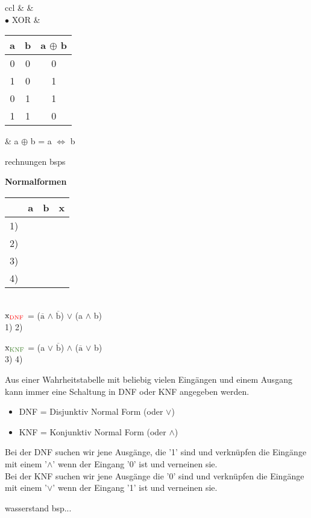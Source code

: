 \begin{tabular}{ccl}
		& & \\
	
	$\bullet$ XOR 
	&
	\begin{tabular}{c|c||c}
		a & b & a $\oplus$ b \\
		\hline
		0 & 0 & 0 \\
		1 & 0 & 1 \\
		0 & 1 & 1 \\
		1 & 1 & 0 \\
	\end{tabular} 
	& a $\oplus$ b = a $\Leftrightarrow$ b \\
	
\end{tabular}

rechnungen bsps

\textbf{Normalformen} \\
\begin{tabular}{cc|c||c}
	  &a & b & x \\
	\hline
	1) & \text{\textcolor{red}{0}} & \text{\textcolor{red}{0}} & \text{\textcolor{red}{1}} \\
	2) & \text{\textcolor{OliveGreen}{1}} & \text{\textcolor{OliveGreen}{0}} & \text{\textcolor{OliveGreen}{0}} \\
	3) & \text{\textcolor{OliveGreen}{0}} & \text{\textcolor{OliveGreen}{1}} & \text{\textcolor{OliveGreen}{0}} \\
	4) & \text{\textcolor{red}{1}} & \text{\textcolor{red}{1}} & \text{\textcolor{red}{1}} \\
\end{tabular} \\
$\text{x}_{\text{\textcolor{red}{DNF}}}$ = ($\overline{\text{a}}$ $\land$ $\overline{\text{b}}$) $\lor$ (a $\land$ b) \\
\text{\textcolor{white}{-------------}} 1) \text{\textcolor{white}{----------}} 2)

$\text{x}_{\text{\textcolor{OliveGreen}{KNF}}}$ = (a $\lor$ $\overline{\text{b}}$) $\land$ ($\overline{\text{a}}$ $\lor$ b) \\
\text{\textcolor{white}{-------------}} 3) \text{\textcolor{white}{----------}} 4)

Aus einer Wahrheitstabelle mit beliebig vielen Eingängen und einem Ausgang kann immer eine Schaltung in DNF oder KNF angegeben werden.
\begin{itemize}
	\item DNF = Disjunktiv Normal Form (oder $\lor$)
	\item KNF = Konjunktiv Normal Form (oder $\land$)
\end{itemize}
Bei der DNF suchen wir jene Ausgänge, die '1' sind und verknüpfen die Eingänge mit einem '$\land$' wenn der Eingang '0' ist und verneinen sie. \\
Bei der KNF suchen wir jene Ausgänge die '0' sind und verknüpfen die Eingänge mit einem '$\lor$' wenn der Eingang '1' ist und verneinen sie.

wasserstand bsp...















